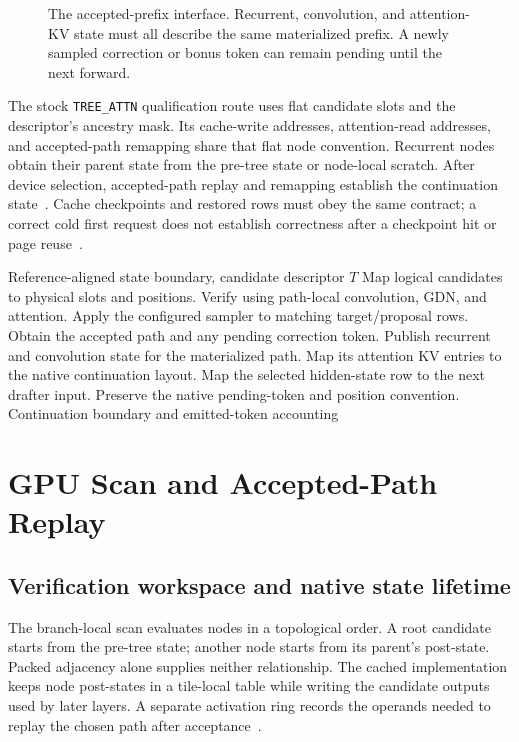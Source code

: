\documentclass[conference]{IEEEtran}
\begin{document}
\begin{figure}[t]
\centering

\caption{The accepted-prefix interface. Recurrent, convolution, and attention-KV state must all describe the same materialized prefix. A newly sampled correction or bonus token can remain pending until the next forward.}
\label{fig:contract}
\end{figure}

The stock \texttt{TREE\_ATTN} qualification route uses flat candidate slots and the descriptor's ancestry mask. Its cache-write addresses, attention-read addresses, and accepted-path remapping share that flat node convention. Recurrent nodes obtain their parent state from the pre-tree state or node-local scratch. After device selection, accepted-path replay and remapping establish the continuation state~\cite{lumo2026archive}. Cache checkpoints and restored rows must obey the same contract; a correct cold first request does not establish correctness after a checkpoint hit or page reuse~\cite{lumo2026stateless}.

\begin{algorithm}[t]
\caption{Logical verifier and continuation boundary}
\label{alg:verify}
\begin{algorithmic}[1]
\REQUIRE Reference-aligned state boundary, candidate descriptor $T$
\STATE Map logical candidates to physical slots and positions.
\STATE Verify using path-local convolution, GDN, and attention.
\STATE Apply the configured sampler to matching target/proposal rows.
\STATE Obtain the accepted path and any pending correction token.
\STATE Publish recurrent and convolution state for the materialized path.
\STATE Map its attention KV entries to the native continuation layout.
\STATE Map the selected hidden-state row to the next drafter input.
\STATE Preserve the native pending-token and position convention.
\RETURN Continuation boundary and emitted-token accounting
\end{algorithmic}
\end{algorithm}

\section{GPU Scan and Accepted-Path Replay}
\label{sec:kernel}
\subsection{Verification workspace and native state lifetime}
The branch-local scan evaluates nodes in a topological order. A root candidate starts from the pre-tree state; another node starts from its parent's post-state. Packed adjacency alone supplies neither relationship. The cached implementation keeps node post-states in a tile-local table while writing the candidate outputs used by later layers. A separate activation ring records the operands needed to replay the chosen path after acceptance~\cite{lumo2026archive}.
\end{document}
